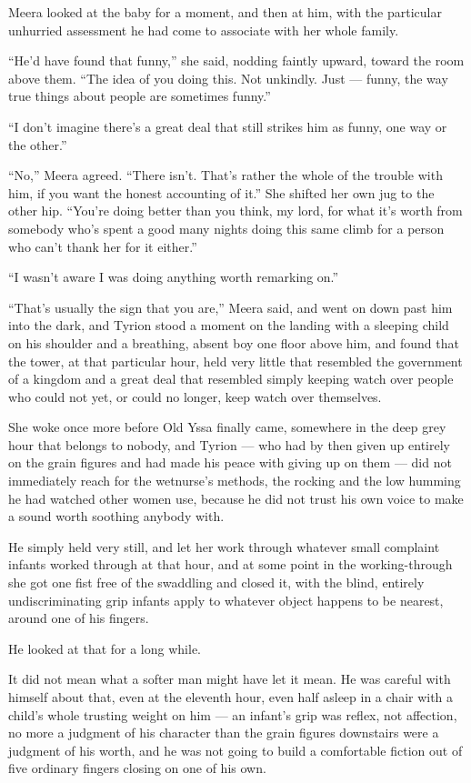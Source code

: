 Meera looked at the baby for a moment, and then at him, with the particular unhurried assessment he had come to associate with her whole family.

“He’d have found that funny,” she said, nodding faintly upward, toward the room above them. “The idea of you doing this. Not unkindly. Just — funny, the way true things about people are sometimes funny.”

“I don’t imagine there’s a great deal that still strikes him as funny, one way or the other.”

“No,” Meera agreed. “There isn’t. That’s rather the whole of the trouble with him, if you want the honest accounting of it.” She shifted her own jug to the other hip. “You’re doing better than you think, my lord, for what it’s worth from somebody who’s spent a good many nights doing this same climb for a person who can’t thank her for it either.”

“I wasn’t aware I was doing anything worth remarking on.”

“That’s usually the sign that you are,” Meera said, and went on down past him into the dark, and Tyrion stood a moment on the landing with a sleeping child on his shoulder and a breathing, absent boy one floor above him, and found that the tower, at that particular hour, held very little that resembled the government of a kingdom and a great deal that resembled simply keeping watch over people who could not yet, or could no longer, keep watch over themselves.

\sceneBreak

She woke once more before Old Yssa finally came, somewhere in the deep grey hour that belongs to nobody, and Tyrion — who had by then given up entirely on the grain figures and had made his peace with giving up on them — did not immediately reach for the wetnurse’s methods, the rocking and the low humming he had watched other women use, because he did not trust his own voice to make a sound worth soothing anybody with.

He simply held very still, and let her work through whatever small complaint infants worked through at that hour, and at some point in the working-through she got one fist free of the swaddling and closed it, with the blind, entirely undiscriminating grip infants apply to whatever object happens to be nearest, around one of his fingers.

He looked at that for a long while.

It did not mean what a softer man might have let it mean. He was careful with himself about that, even at the eleventh hour, even half asleep in a chair with a child’s whole trusting weight on him — an infant’s grip was reflex, not affection, no more a judgment of his character than the grain figures downstairs were a judgment of his worth, and he was not going to build a comfortable fiction out of five ordinary fingers closing on one of his own.

